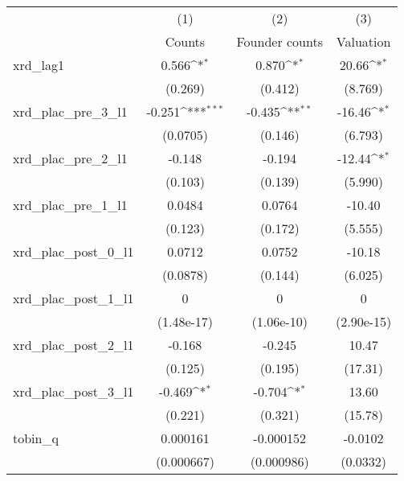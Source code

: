 {
\def\sym#1{\ifmmode^{#1}\else\(^{#1}\)\fi}
\begin{tabular}{l*{3}{c}}
\hline\hline
            &\multicolumn{1}{c}{(1)}&\multicolumn{1}{c}{(2)}&\multicolumn{1}{c}{(3)}\\
            &\multicolumn{1}{c}{Counts}&\multicolumn{1}{c}{Founder counts}&\multicolumn{1}{c}{Valuation}\\
\hline
xrd\_lag1    &       0.566\sym{*}  &       0.870\sym{*}  &       20.66\sym{*}  \\
            &     (0.269)         &     (0.412)         &     (8.769)         \\
[1em]
xrd\_plac\_pre\_3\_l1&      -0.251\sym{***}&      -0.435\sym{**} &      -16.46\sym{*}  \\
            &    (0.0705)         &     (0.146)         &     (6.793)         \\
[1em]
xrd\_plac\_pre\_2\_l1&      -0.148         &      -0.194         &      -12.44\sym{*}  \\
            &     (0.103)         &     (0.139)         &     (5.990)         \\
[1em]
xrd\_plac\_pre\_1\_l1&      0.0484         &      0.0764         &      -10.40         \\
            &     (0.123)         &     (0.172)         &     (5.555)         \\
[1em]
xrd\_plac\_post\_0\_l1&      0.0712         &      0.0752         &      -10.18         \\
            &    (0.0878)         &     (0.144)         &     (6.025)         \\
[1em]
xrd\_plac\_post\_1\_l1&           0         &           0         &           0         \\
            &  (1.48e-17)         &  (1.06e-10)         &  (2.90e-15)         \\
[1em]
xrd\_plac\_post\_2\_l1&      -0.168         &      -0.245         &       10.47         \\
            &     (0.125)         &     (0.195)         &     (17.31)         \\
[1em]
xrd\_plac\_post\_3\_l1&      -0.469\sym{*}  &      -0.704\sym{*}  &       13.60         \\
            &     (0.221)         &     (0.321)         &     (15.78)         \\
[1em]
tobin\_q     &    0.000161         &   -0.000152         &     -0.0102         \\
            &  (0.000667)         &  (0.000986)         &    (0.0332)         \\

\end{tabular}}
